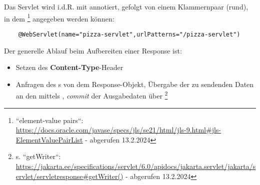 Das Servlet wird i.d.R. mit  annotiert, gefolgt von einem Klammernpaar (rund), in dem \footnote{
``element-value pairs``: \url{https://docs.oracle.com/javase/specs/jls/se21/html/jls-9.html#jls-ElementValuePairList} - abgerufen 13.2.2024
} angegeben werden können:

\begin{verbatim}
    @WebServlet(name="pizza-servlet",urlPatterns="/pizza-servlet")
\end{verbatim}
Der generelle Ablauf beim Aufbereiten einer Response ist:

\begin{itemize}
    \item Setzen des \textbf{Content-Type}-Header
    \item Anfragen des s von dem Response-Objekt, Übergabe der zu sendenden Daten an den  mittels , \textit{commit} der Ausgabedaten über \footnote{
    s. ``getWriter``: \url{https://jakarta.ee/specifications/servlet/6.0/apidocs/jakarta.servlet/jakarta/servlet/servletresponse#getWriter()} - abgerufen 13.2.2024
    }
\end{itemize}


